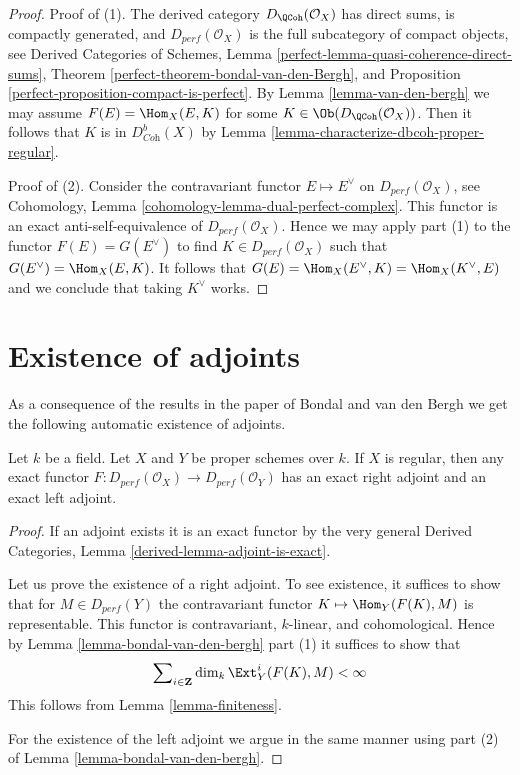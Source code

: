 \begin{proof}
Proof of (1). The derived category $D_\QCoh(\mathcal{O}_X)$ has direct sums,
is compactly generated, and $D_{perf}(\mathcal{O}_X)$ is the full subcategory
of compact objects, see
Derived Categories of Schemes, Lemma
\ref{perfect-lemma-quasi-coherence-direct-sums},
Theorem \ref{perfect-theorem-bondal-van-den-Bergh}, and
Proposition \ref{perfect-proposition-compact-is-perfect}.
By Lemma \ref{lemma-van-den-bergh} we may assume
$F(E) = \Hom_X(E, K)$ for some $K \in \Ob(D_\QCoh(\mathcal{O}_X))$.
Then it follows that $K$ is in $D^b_{\textit{Coh}}(X)$
by Lemma \ref{lemma-characterize-dbcoh-proper-regular}.

\medskip\noindent
Proof of (2). Consider the contravariant functor $E \mapsto E^\vee$
on $D_{perf}(\mathcal{O}_X)$, see
Cohomology, Lemma \ref{cohomology-lemma-dual-perfect-complex}.
This functor is an exact anti-self-equivalence of $D_{perf}(\mathcal{O}_X)$.
Hence we may apply part (1) to the functor $F(E) = G(E^\vee)$ to find
$K \in D_{perf}(\mathcal{O}_X)$ such that $G(E^\vee) = \Hom_X(E, K)$.
It follows that $G(E) = \Hom_X(E^\vee, K) = \Hom_X(K^\vee, E)$
and we conclude that taking $K^\vee$ works.
\end{proof}






\section{Existence of adjoints}
\label{section-adjoints}

\noindent
As a consequence of the results in the paper of Bondal and van den Bergh
we get the following automatic existence of adjoints.

\begin{lemma}
\label{lemma-always-right-adjoints}
Let $k$ be a field. Let $X$ and $Y$ be proper schemes over $k$.
If $X$ is regular, then any exact functor
$F : D_{perf}(\mathcal{O}_X) \to D_{perf}(\mathcal{O}_Y)$
has an exact right adjoint and an exact left adjoint.
\end{lemma}

\begin{proof}
If an adjoint exists it is an exact functor by the very general
Derived Categories, Lemma \ref{derived-lemma-adjoint-is-exact}.

\medskip\noindent
Let us prove the existence of a right adjoint.
To see existence, it suffices to show that for
$M \in D_{perf}(Y)$ the contravariant functor
$K \mapsto \Hom_Y(F(K), M)$ is representable.
This functor is contravariant, $k$-linear, and cohomological.
Hence by Lemma \ref{lemma-bondal-van-den-bergh} part (1)
it suffices to show that
$$
\sum\nolimits_{i \in \mathbf{Z}} \dim_k \Ext^i_Y(F(K), M) < \infty
$$
This follows from Lemma \ref{lemma-finiteness}.

\medskip\noindent
For the existence of the left adjoint we argue in the same
manner using part (2) of Lemma \ref{lemma-bondal-van-den-bergh}.
\end{proof}






